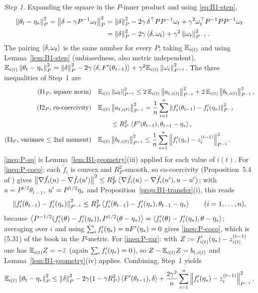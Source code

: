 \emph{Step 1.} Expanding the square in the $P$-inner product and using \eqref{eq:B1-step},
\begin{align}
\left\|\theta_t-\eta_\ast\right\|_P^2=\left\|\delta-\gamma P^{-1}\omega_t\right\|_P^2
&=\left\|\delta\right\|_P^2-2\gamma\,\delta^\top PP^{-1}\omega_t+\gamma^2\omega_t^\top P^{-1}PP^{-1}\omega_t\nonumber\\
&=\left\|\delta\right\|_P^2-2\gamma\left\langle \delta, \omega_t \right\rangle+\gamma^2\left\|\omega_t\right\|_{P^{-1}}^2 .\label{eq:B1-expand}
\end{align}
The pairing $\left\langle \delta, \omega_t \right\rangle$ is the same number for every $P$; taking $\mathbb{E}_{i(t)}$ and using
Lemma~\ref{lem:B1-step} (unbiasedness, also metric independent),
$\mathbb{E}_{i(t)}\left\|\theta_t-\eta_\ast\right\|_P^2=\left\|\delta\right\|_P^2-2\gamma\left\langle \delta, F'(\theta_{t-1}) \right\rangle
+\gamma^2\mathbb{E}_{i(t)}\left\|\omega_t\right\|_{P^{-1}}^2$. The three inequalities of Step~1 are
\begin{align}
\text{(I1$_P$, square norm)}\quad&
\mathbb{E}_{i(t)}\left\|\omega_t\right\|_{P^{-1}}^2\le 2\,\mathbb{E}_{i(t)}\left\|a_{t,i(t)}\right\|_{P^{-1}}^2+2\,\mathbb{E}_{i(t)}\left\|b_{t,i(t)}\right\|_{P^{-1}}^2,
\label{ineq:P-sq}\\
\text{(I2$_P$, co-coercivity)}\quad&
\mathbb{E}_{i(t)}\left\|a_{t,i(t)}\right\|_{P^{-1}}^2=\frac1n\sum_{i=1}^n\left\|f'_i(\theta_{t-1})-f'_i(\eta_\ast)\right\|_{P^{-1}}^2\nonumber\\
&\qquad\le R_P^2\,\left\langle F'(\theta_{t-1}), \theta_{t-1}-\eta_\ast \right\rangle,
\label{ineq:P-coco}\\
\text{(I3$_P$, variance $\le$ 2nd moment)}\quad&
\mathbb{E}_{i(t)}\left\|b_{t,i(t)}\right\|_{P^{-1}}^2\le\frac1n\sum_{i=1}^n\left\|f'_i(\eta_\ast)-z_i^{(t-1)}\right\|_{P^{-1}}^2 .
\label{ineq:P-var}
\end{align}
\eqref{ineq:P-sq} is Lemma~\ref{lem:B1-geometry}(iii) applied for each value of $i(t)$. For
\eqref{ineq:P-coco}: each $\tilde f_i$ is convex and $R_P^2$-smooth, so co-coercivity (Proposition~5.4 of
\cite{bach2024learning}) gives
$\left\|\nabla\tilde f_i(u)-\nabla\tilde f_i(u')\right\|^2\le R_P^2\left\langle \nabla\tilde f_i(u)-\nabla\tilde f_i(u'), u-u' \right\rangle$;
with $u=P^{1/2}\theta_{t-1}$, $u'=P^{1/2}\eta_\ast$ and Proposition~\ref{prop:B1-transfer}(i), this reads
\begin{equation}\label{eq:B1-coco-i}
\left\|f'_i(\theta_{t-1})-f'_i(\eta_\ast)\right\|_{P^{-1}}^2\le R_P^2\left\langle f'_i(\theta_{t-1})-f'_i(\eta_\ast), \theta_{t-1}-\eta_\ast \right\rangle
\qquad(i=1,\dots,n),
\end{equation}
because $\left\langle P^{-1/2}(f'_i(\theta)-f'_i(\eta_\ast)), P^{1/2}(\theta-\eta_\ast) \right\rangle
=\left\langle f'_i(\theta)-f'_i(\eta_\ast), \theta-\eta_\ast \right\rangle$; averaging over $i$ and using
$\sum_if'_i(\eta_\ast)=nF'(\eta_\ast)=0$ gives \eqref{ineq:P-coco}, which is (5.31) of the book in the
$P$-metric. For \eqref{ineq:P-var}: with $Z:=f'_{i(t)}(\eta_\ast)-z_{i(t)}^{(t-1)}$ one has $\mathbb{E}_{i(t)} Z=-\bar z$
(again $\sum_if'_i(\eta_\ast)=0$), so $Z-\mathbb{E}_{i(t)} Z=b_{t,i(t)}$ and Lemma~\ref{lem:B1-geometry}(iv) applies.
Combining, Step~1 yields
\begin{equation}\label{eq:B1-step1}
\mathbb{E}_{i(t)}\left\|\theta_t-\eta_\ast\right\|_P^2\le\left\|\delta\right\|_P^2-2\gamma(1-\gamma R_P^2)\left\langle F'(\theta_{t-1}), \delta \right\rangle
+\frac{2\gamma^2}{n}\sum_{i=1}^n\left\|f'_i(\eta_\ast)-z_i^{(t-1)}\right\|_{P^{-1}}^2 .
\end{equation}

